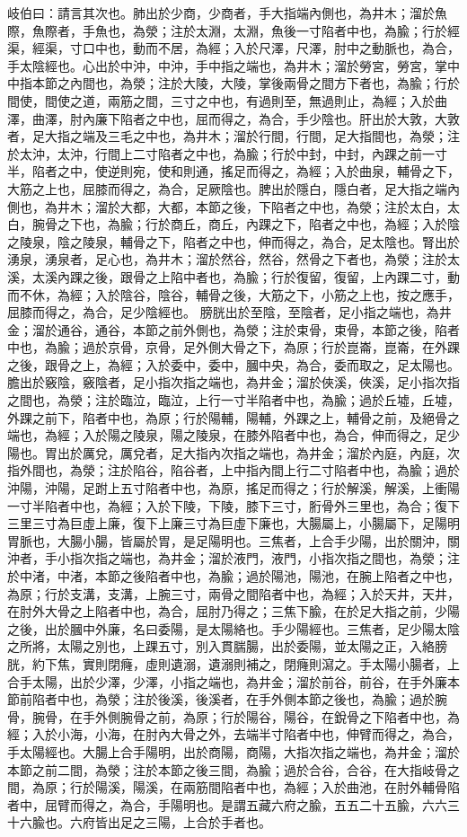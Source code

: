 岐伯曰：請言其次也。肺出於少商，少商者，手大指端內側也，為井木；溜於魚際，魚際者，手魚也，為滎；注於太淵，太淵，魚後一寸陷者中也，為腧；行於經渠，經渠，寸口中也，動而不居，為經；入於尺澤，尺澤，肘中之動脈也，為合，手太陰經也。心出於中沖，中沖，手中指之端也，為井木；溜於勞宮，勞宮，掌中中指本節之內間也，為滎；注於大陵，大陵，掌後兩骨之間方下者也，為腧；行於間使，間使之道，兩筋之間，三寸之中也，有過則至，無過則止，為經；入於曲澤，曲澤，肘內廉下陷者之中也，屈而得之，為合，手少陰也。肝出於大敦，大敦者，足大指之端及三毛之中也，為井木；溜於行間，行間，足大指間也，為滎；注於太沖，太沖，行間上二寸陷者之中也，為腧；行於中封，中封，內踝之前一寸半，陷者之中，使逆則宛，使和則通，搖足而得之，為經；入於曲泉，輔骨之下，大筋之上也，屈膝而得之，為合，足厥陰也。脾出於隱白，隱白者，足大指之端內側也，為井木；溜於大都，大都，本節之後，下陷者之中也，為滎；注於太白，太白，腕骨之下也，為腧；行於商丘，商丘，內踝之下，陷者之中也，為經；入於陰之陵泉，陰之陵泉，輔骨之下，陷者之中也，伸而得之，為合，足太陰也。腎出於湧泉，湧泉者，足心也，為井木；溜於然谷，然谷，然骨之下者也，為滎；注於太溪，太溪內踝之後，跟骨之上陷中者也，為腧；行於復留，復留，上內踝二寸，動而不休，為經；入於陰谷，陰谷，輔骨之後，大筋之下，小筋之上也，按之應手，屈膝而得之，為合，足少陰經也。
膀胱出於至陰，至陰者，足小指之端也，為井金；溜於通谷，通谷，本節之前外側也，為滎；注於束骨，束骨，本節之後，陷者中也，為腧；過於京骨，京骨，足外側大骨之下，為原；行於崑崙，崑崙，在外踝之後，跟骨之上，為經；入於委中，委中，膕中央，為合，委而取之，足太陽也。膽出於竅陰，竅陰者，足小指次指之端也，為井金；溜於俠溪，俠溪，足小指次指之間也，為滎；注於臨泣，臨泣，上行一寸半陷者中也，為腧；過於丘墟，丘墟，外踝之前下，陷者中也，為原；行於陽輔，陽輔，外踝之上，輔骨之前，及絕骨之端也，為經；入於陽之陵泉，陽之陵泉，在膝外陷者中也，為合，伸而得之，足少陽也。胃出於厲兌，厲兌者，足大指內次指之端也，為井金；溜於內庭，內庭，次指外間也，為滎；注於陷谷，陷谷者，上中指內間上行二寸陷者中也，為腧；過於沖陽，沖陽，足跗上五寸陷者中也，為原，搖足而得之；行於解溪，解溪，上衝陽一寸半陷者中也，為經；入於下陵，下陵，膝下三寸，胻骨外三里也，為合；復下三里三寸為巨虛上廉，復下上廉三寸為巨虛下廉也，大腸屬上，小腸屬下，足陽明胃脈也，大腸小腸，皆屬於胃，是足陽明也。三焦者，上合手少陽，出於關沖，關沖者，手小指次指之端也，為井金；溜於液門，液門，小指次指之間也，為滎；注於中渚，中渚，本節之後陷者中也，為腧；過於陽池，陽池，在腕上陷者之中也，為原；行於支溝，支溝，上腕三寸，兩骨之間陷者中也，為經；入於天井，天井，在肘外大骨之上陷者中也，為合，屈肘乃得之；三焦下腧，在於足大指之前，少陽之後，出於膕中外廉，名曰委陽，是太陽絡也。手少陽經也。三焦者，足少陽太陰之所將，太陽之別也，上踝五寸，別入貫腨腸，出於委陽，並太陽之正，入絡膀胱，約下焦，實則閉癃，虛則遺溺，遺溺則補之，閉癃則瀉之。手太陽小腸者，上合手太陽，出於少澤，少澤，小指之端也，為井金；溜於前谷，前谷，在手外廉本節前陷者中也，為滎；注於後溪，後溪者，在手外側本節之後也，為腧；過於腕骨，腕骨，在手外側腕骨之前，為原；行於陽谷，陽谷，在銳骨之下陷者中也，為經；入於小海，小海，在肘內大骨之外，去端半寸陷者中也，伸臂而得之，為合，手太陽經也。大腸上合手陽明，出於商陽，商陽，大指次指之端也，為井金；溜於本節之前二間，為滎；注於本節之後三間，為腧；過於合谷，合谷，在大指岐骨之間，為原；行於陽溪，陽溪，在兩筋間陷者中也，為經；入於曲池，在肘外輔骨陷者中，屈臂而得之，為合，手陽明也。是謂五藏六府之腧，五五二十五腧，六六三十六腧也。六府皆出足之三陽，上合於手者也。

